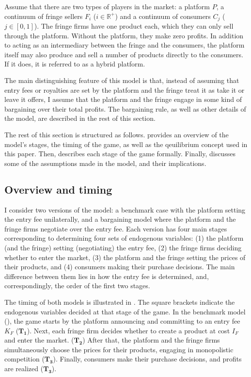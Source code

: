 \documentclass[a4paper]{article}
\begin{document}
Assume that there are two types of players in the market: a platform $P$, a continuum of fringe sellers $F_i$ ($i \in \mathbb{R}^+$) and a continuum of consumers $C_j$ ($j \in [0, 1]$).
The fringe firms have one product each, which they can only sell through the platform.
Without the platform, they make zero profits.
In addition to acting as an intermediary between the fringe and the consumers, the platform itself may also produce and sell a number of products directly to the consumers.
If it does, it is referred to as a hybrid platform.

The main distinguishing feature of this model is that, instead of assuming that entry fees or royalties are set by the platform and the fringe treat it as take it or leave it offers, I assume that the platform and the fringe engage in some kind of bargaining over their total profits.
The bargaining rule, as well as other details of the model, are described in the rest of this section.

The rest of this section is structured as follows.
 provides an overview of the model's stages, the timing of the game, as well as the qeuilibrium concept used in this paper.
Then,  describes each stage of the game formally.
Finally,  discusses some of the assumptions made in the model, and their implications.

\subsection{Overview and timing}
\label{sec:model_overview}

I consider two versions of the model: a benchmark case with the platform setting the entry fee unilaterally, and a bargaining model where the platform and the fringe firms negotiate over the entry fee.
Each version has four main stages corresponding to determining four sets of endogenous variables: (1) the platform (and the fringe) setting (negotiating) the entry fee, (2) the fringe firms deciding whether to enter the market, (3) the platform and the fringe setting the prices of their products, and (4) consumers making their purchase decisions.
The main difference between them lies in how the entry fee is determined, and, correspondingly, the order of the first two stages.

The timing of both models is illustrated in .
The square brackets indicate the endogenous variables decided at that stage of the game.
In the benchmark model (), the game starts by the platform announcing and committing to an entry fee $K_F$ ($\mathbf{T_1}$).
Next, each fringe firm decides whether to create a product at cost $I_F$ and enter the market. ($\mathbf{T_2}$)
After that, the platform and the fringe firms simultaneously choose the prices for their products, engaging in monopolistic competition ($\mathbf{T_3}$).
Finally, consumers make their purchase decisions, and profits are realized ($\mathbf{T_3}$).
\end{document}
